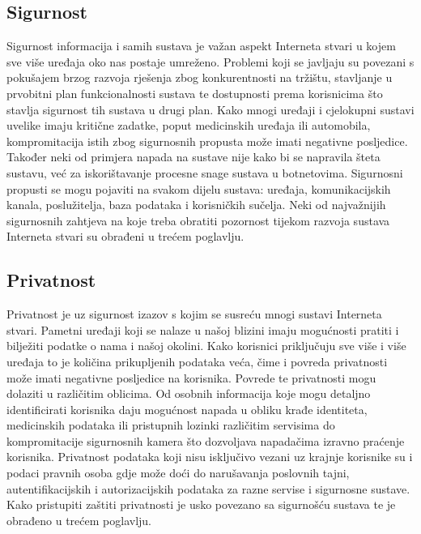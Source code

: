 \documentclass[times, utf8, diplomski]{fer}
\begin{document}
\subsection{Sigurnost}
Sigurnost informacija i samih sustava je važan aspekt Interneta stvari u kojem sve više uređaja oko nas postaje umreženo. Problemi koji se javljaju su povezani s pokušajem brzog razvoja rješenja zbog konkurentnosti na tržištu, stavljanje u prvobitni plan funkcionalnosti sustava te dostupnosti prema korisnicima što stavlja sigurnost tih sustava u drugi plan. Kako mnogi uređaji i cjelokupni sustavi uvelike imaju kritične zadatke, poput medicinskih uređaja ili automobila, kompromitacija istih zbog sigurnosnih propusta može imati negativne posljedice. Također neki od primjera napada na sustave nije kako bi se napravila šteta sustavu, već za iskorištavanje procesne snage sustava u botnetovima. Sigurnosni propusti se mogu pojaviti na svakom dijelu sustava: uređaja, komunikacijskih kanala, poslužitelja, baza podataka i korisničkih sučelja. Neki od najvažnijih sigurnosnih zahtjeva na koje treba obratiti pozornost tijekom razvoja sustava Interneta stvari su obrađeni u trećem poglavlju.

\subsection{Privatnost}
Privatnost je uz sigurnost izazov s kojim se susreću mnogi sustavi Interneta stvari. Pametni uređaji koji se nalaze u našoj blizini imaju mogućnosti pratiti i bilježiti podatke o nama i našoj okolini. Kako korisnici priključuju sve više i više uređaja to je količina prikupljenih podataka veća, čime i povreda privatnosti može imati negativne posljedice na korisnika. Povrede te privatnosti mogu dolaziti u različitim oblicima. Od osobnih informacija koje mogu detaljno identificirati korisnika daju mogućnost napada u obliku krađe identiteta, medicinskih podataka ili pristupnih lozinki različitim servisima do kompromitacije sigurnosnih kamera što dozvoljava napadačima izravno praćenje korisnika. Privatnost podataka koji nisu isključivo vezani uz krajnje korisnike su i podaci pravnih osoba gdje može doći do narušavanja poslovnih tajni, autentifikacijskih i autorizacijskih podataka za razne servise i sigurnosne sustave. Kako pristupiti zaštiti privatnosti je usko povezano sa sigurnošću sustava te je obrađeno u trećem poglavlju.
\end{document}
